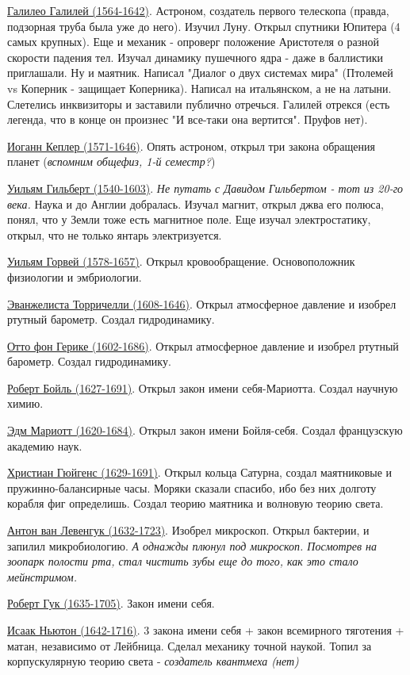\underline{Галилео Галилей (1564-1642)}. Астроном, создатель первого телескопа (правда, подзорная труба была уже до него). Изучил Луну. Открыл спутники Юпитера (4 самых крупных). Еще и механик - опроверг положение Аристотеля о разной скорости падения тел. Изучал динамику пушечного ядра - даже в баллистики приглашали. Ну и маятник. Написал "Диалог о двух системах мира" (Птолемей vs Коперник - защищает Коперника). Написал на итальянском, а не на латыни. Слетелись инквизиторы и заставили публично отречься. Галилей отрекся (есть легенда, что в конце он произнес "И все-таки она вертится". Пруфов нет).  

\underline{Иоганн Кеплер (1571-1646)}. Опять астроном, открыл три закона обращения планет (\textit{вспомним общефиз, 1-й семестр?})

\underline{Уильям Гильберт (1540-1603)}. \textit{Не путать с Давидом Гильбертом - тот из 20-го века.} Наука и до Англии добралась. Изучал магнит, открыл джва его полюса, понял, что у Земли тоже есть магнитное поле. Еще изучал электростатику, открыл, что не только янтарь электризуется.

\underline{Уильям Горвей (1578-1657)}. Открыл кровообращение. Основоположник физиологии и эмбриологии.

\underline{Эванжелиста Торричелли (1608-1646)}. Открыл атмосферное давление и изобрел ртутный барометр. Создал гидродинамику.

\underline{Отто фон Герике (1602-1686)}. Открыл атмосферное давление и изобрел ртутный барометр. Создал гидродинамику.

\underline{Роберт Бойль (1627-1691)}. Открыл закон имени себя-Мариотта. Создал научную химию.

\underline{Эдм Мариотт (1620-1684)}. Открыл закон имени Бойля-себя. Создал французскую академию наук.

\underline{Христиан Гюйгенс (1629-1691)}. Открыл кольца Сатурна, создал маятниковые и пружинно-балансирные часы. Моряки сказали спасибо, ибо без них долготу корабля фиг определишь. Создал теорию маятника и волновую теорию света.

\underline{Антон ван Левенгук (1632-1723)}. Изобрел микроскоп. Открыл бактерии, и запилил микробиологию. \textit{А однажды плюнул под микроскоп. Посмотрев на зоопарк полости рта, стал чистить зубы еще до того, как это стало мейнстримом.}

\underline{Роберт Гук (1635-1705)}. Закон имени себя.

\underline{Исаак Ньютон (1642-1716)}. 3 закона имени себя + закон всемирного тяготения + матан, независимо от Лейбница. Сделал механику точной наукой. Топил за корпускулярную теорию света - \textit{создатель квантмеха (нет)}
 
